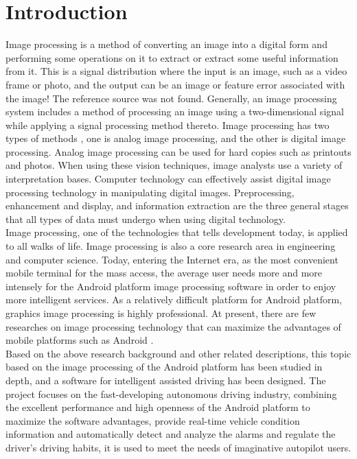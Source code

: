 \documentclass[12pt, a4paper]{article}
\begin{document}
\section{Introduction} 
Image processing is a method of converting an image into a digital form and performing some operations on it to extract or extract some useful information \cite{j} from it. This is a signal distribution where the input is an image, such as a video frame or photo, and the output can be an image or feature error associated with the image! The reference source was not found. Generally, an image processing system includes a method of processing an image using a two-dimensional signal while applying a signal processing method thereto. Image processing has two types of methods \cite{nii}, one is analog image processing, and the other is digital image processing. Analog image processing can be used for hard copies such as printouts and photos. When using these vision techniques, image analysts use a variety of interpretation bases. Computer technology can effectively assist digital image processing technology in manipulating digital images. Preprocessing, enhancement and display, and information extraction are the three general stages that all types of data must undergo when using digital technology.\\Image processing, one of the technologies that tells development today, is applied to all walks of life. Image processing is also a core research area in engineering and computer science. Today, entering the Internet era, as the most convenient mobile terminal for the mass access, the average user needs more and more intensely for the Android platform image processing software in order to enjoy more intelligent services. As a relatively difficult platform for Android platform, graphics image processing is highly professional. At present, there are few researches on image processing technology that can maximize the advantages of mobile platforms such as Android \cite{za}.
\\Based on the above research background and other related descriptions, this topic based on the image processing of the Android platform has been studied in depth, and a software for intelligent assisted driving has been designed. The project focuses on the fast-developing autonomous driving industry, combining the excellent performance and high openness of the Android platform to maximize the software advantages, provide real-time vehicle condition information and automatically detect and analyze the alarms and regulate the driver's driving habits, it is used to meet the needs of imaginative autopilot users.
\end{document}

